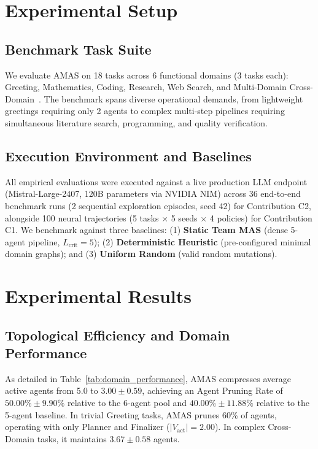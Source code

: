 \documentclass[conference]{IEEEtran}
\begin{document}
\section{Experimental Setup}
\label{sec:experimental_setup}

\subsection{Benchmark Task Suite}
We evaluate AMAS on 18 tasks across 6 functional domains (3 tasks each): Greeting, Mathematics, Coding, Research, Web Search, and Multi-Domain Cross-Domain~\cite{liu2024agentbench}. The benchmark spans diverse operational demands, from lightweight greetings requiring only 2 agents to complex multi-step pipelines requiring simultaneous literature search, programming, and quality verification.

\subsection{Execution Environment and Baselines}
All empirical evaluations were executed against a live production LLM endpoint (Mistral-Large-2407, 120B parameters via NVIDIA NIM) across 36 end-to-end benchmark runs (2 sequential exploration episodes, seed 42) for Contribution C2, alongside 100 neural trajectories (5 tasks $\times$ 5 seeds $\times$ 4 policies) for Contribution C1. We benchmark against three baselines: (1) \textbf{Static Team MAS} (dense 5-agent pipeline, $L_{\mathrm{crit}}=5$); (2) \textbf{Deterministic Heuristic} (pre-configured minimal domain graphs); and (3) \textbf{Uniform Random} (valid random mutations).

\section{Experimental Results}
\label{sec:experimental_results}

\subsection{Topological Efficiency and Domain Performance}
As detailed in Table~\ref{tab:domain_performance}, AMAS compresses average active agents from 5.0 to $\mathbf{3.00 \pm 0.59}$, achieving an Agent Pruning Rate of $\mathbf{50.00\% \pm 9.90\%}$ relative to the 6-agent pool and $\mathbf{40.00\% \pm 11.88\%}$ relative to the 5-agent baseline. In trivial Greeting tasks, AMAS prunes 60\% of agents, operating with only Planner and Finalizer ($|V_{\mathrm{act}}| = 2.00$). In complex Cross-Domain tasks, it maintains $3.67 \pm 0.58$ agents.
\end{document}
